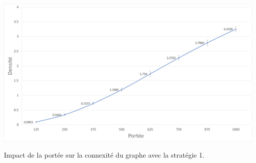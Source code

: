\documentclass[a4paper]{article}
\begin{document}
\begin{minipage}[c]{0.5\linewidth}
\includegraphics[width=\textwidth]{images/q10-11.png}
\begin{center}
  Impact de la portée sur la connexité du graphe avec la stratégie 1.
  \end{center}
\end{minipage}
\pagebreak
\end{document}
